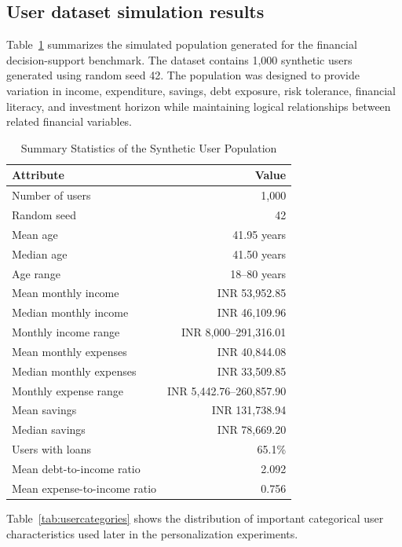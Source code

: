 \documentclass[12pt,a4paper]{article}
\begin{document}
\subsection{User dataset simulation results}

Table~\ref{tab:userstats} summarizes the simulated population generated for the financial decision-support benchmark. The dataset contains 1,000 synthetic users generated using random seed 42. The population was designed to provide variation in income, expenditure, savings, debt exposure, risk tolerance, financial literacy, and investment horizon while maintaining logical relationships between related financial variables.

\begin{table}[H]
\centering
\caption{Summary Statistics of the Synthetic User Population}
\label{tab:userstats}
\small
\begin{tabular}{p{}r}
\toprule
\textbf{Attribute} & \textbf{Value} \\
\midrule
Number of users & 1,000 \\
Random seed & 42 \\
Mean age & 41.95 years \\
Median age & 41.50 years \\
Age range & 18--80 years \\
Mean monthly income & INR 53,952.85 \\
Median monthly income & INR 46,109.96 \\
Monthly income range & INR 8,000--291,316.01 \\
Mean monthly expenses & INR 40,844.08 \\
Median monthly expenses & INR 33,509.85 \\
Monthly expense range & INR 5,442.76--260,857.90 \\
Mean savings & INR 131,738.94 \\
Median savings & INR 78,669.20 \\
Users with loans & 65.1\% \\
Mean debt-to-income ratio & 2.092 \\
Mean expense-to-income ratio & 0.756 \\
\bottomrule
\end{tabular}
\end{table}

Table~\ref{tab:usercategories} shows the distribution of important categorical user characteristics used later in the personalization experiments.
\end{document}
